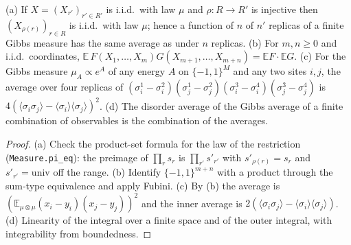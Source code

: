 \begin{lemma}
\label{lem:sg-tal:replica-marginals}
  \leanok
{}
(a) If $X=(X_{r'})_{r'\in R'}$ is i.i.d.\ with law $\mu$ and $\rho:R\to R'$ is injective then $(X_{\rho(r)})_{r\in R}$ is i.i.d.\ with law $\mu$; hence a function of $n$ of $n'$ replicas of a finite Gibbs measure has the same average as under $n$ replicas.  (b) For $m,n\ge0$ and i.i.d.\ coordinates, $\mathbb E\,F(X_1,\dots,X_m)G(X_{m+1},\dots,X_{m+n})=\mathbb EF\cdot\mathbb EG$.  (c) For the Gibbs measure $\mu_A\propto e^A$ of any energy $A$ on $\{-1,1\}^M$ and any two sites $i,j$, the average over four replicas of $(\sigma^1_i-\sigma^2_i)(\sigma^1_j-\sigma^2_j)(\sigma^3_i-\sigma^4_i)(\sigma^3_j-\sigma^4_j)$ is $4(\langle\sigma_i\sigma_j\rangle-\langle\sigma_i\rangle\langle\sigma_j\rangle)^2$.  (d) The disorder average of the Gibbs average of a finite combination of observables is the combination of the averages.
\end{lemma}
\begin{proof}
  \leanok
(a) Check the product-set formula for the law of the restriction (\texttt{Measure.pi\_eq}): the preimage of $\prod_rs_r$ is $\prod_{r'}s'_{r'}$ with $s'_{\rho(r)}=s_r$ and $s'_{r'}=\mathrm{univ}$ off the range.  (b) Identify $\{-1,1\}^{m+n}$ with a product through the sum-type equivalence and apply Fubini.  (c) By (b) the average is $(\mathbb E_{\mu\otimes\mu}(x_i-y_i)(x_j-y_j))^2$ and the inner average is $2(\langle\sigma_i\sigma_j\rangle-\langle\sigma_i\rangle\langle\sigma_j\rangle)$.  (d) Linearity of the integral over a finite space and of the outer integral, with integrability from boundedness.
\end{proof}

